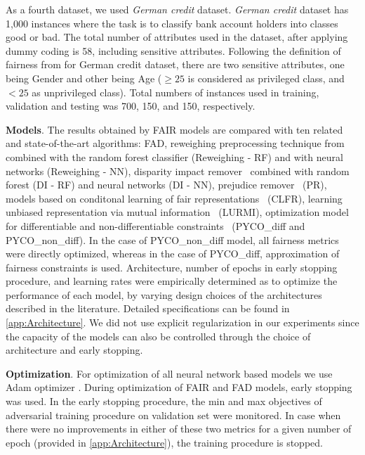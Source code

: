 \documentclass[preprint,12pt]{elsarticle}
\begin{document}
As a fourth dataset, we used \textit{German credit} dataset. \textit{German credit} dataset has 1,000 instances where the task is to classify bank account holders into classes good or bad. The total number of attributes used in the dataset, after applying dummy coding is 58, including sensitive attributes. Following the definition of fairness from \cite{kamiran2012decision} for German credit dataset, there are two sensitive attributes, one being Gender and other being Age ($\geq 25$ is considered as privileged class, and $< 25$ as unprivileged class).  Total numbers of instances used in training, validation and testing was 700, 150, and 150, respectively.

\textbf{Models}. \sloppy The results obtained by FAIR models are compared with ten related and state-of-the-art algorithms: FAD, reweighing preprocessing technique from~\cite{kamiran2012data} combined with the random forest classifier (Reweighing - RF) and with neural networks (Reweighing - NN), disparity impact remover~\cite{feldman2015certifying} combined with random forest (DI - RF) and neural networks (DI - NN), prejudice remover~\cite{kamishima2012fairness} (PR), models based on conditonal learning of fair representations~\cite{zhao2019conditional} (CLFR), learning unbiased representation via mutual information~\cite{ragonesi2021learning} (LURMI), optimization model for differentiable and non-differentiable constraints~\cite{cotter2019optimization} (PYCO\_diff and PYCO\_non\_diff). In the case of PYCO\_non\_diff model, all fairness metrics were directly optimized, whereas in the case of PYCO\_diff, approximation of fairness constraints is used. Architecture, number of epochs in early stopping procedure, and learning rates were empirically determined as to optimize the performance of each model, by varying design choices of the architectures described in the literature. Detailed specifications can be found in \ref{app:Architecture}. We did not use explicit regularization in our experiments since the capacity of the models can also be controlled through the choice of architecture and early stopping.

\textbf{Optimization}.
For optimization of all neural network based models we use Adam optimizer \cite{bock2019proof}.
During optimization of FAIR and FAD models, early stopping was used. In the early stopping procedure, the min and max objectives of adversarial training procedure on validation set were monitored. In case when there were no improvements in either of these two metrics for a given number of epoch (provided in \ref{app:Architecture}), the training procedure is stopped.
\end{document}

